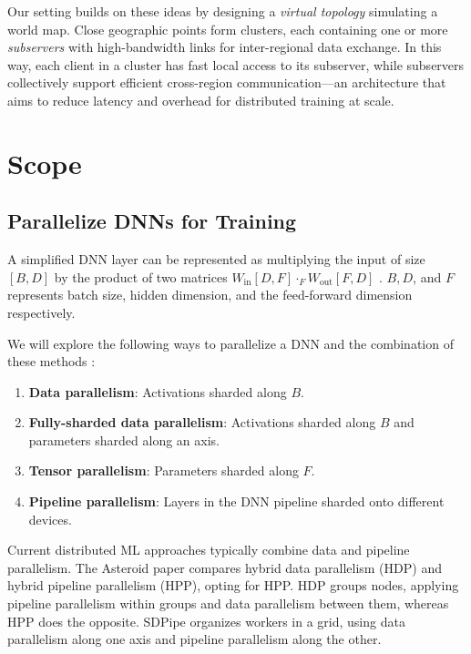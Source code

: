 \documentclass{article}
\begin{document}
Our setting builds on these ideas by designing a \emph{virtual topology} simulating a world map. Close geographic points form clusters, each containing one or more \emph{subservers} with high-bandwidth links for inter-regional data exchange. In this way, each client in a cluster has fast local access to its subserver, while subservers collectively support efficient cross-region communication—an architecture that aims to reduce latency and overhead for distributed training at scale.

\section{Scope}

\subsection{Parallelize DNNs for Training}

A simplified DNN layer can be represented as multiplying the input of size $[B, D]$ by the product of two matrices $W_{\text{in}}[D, F] \cdot_F W_{\text{out}} [F, D]$ \cite{scaling-book}. $B, D$, and $F$ represents batch size, hidden dimension, and the feed-forward dimension respectively.

We will explore the following ways to parallelize a DNN and the combination of these methods \cite{scaling-book}:

\begin{enumerate}
    \item \textbf{Data parallelism}: Activations sharded along $B$.
    \item \textbf{Fully-sharded data parallelism}: Activations sharded along $B$ and parameters sharded along an axis.
    \item \textbf{Tensor parallelism}: Parameters sharded along $F$.
    \item \textbf{Pipeline parallelism}: Layers in the DNN pipeline sharded onto different devices.
\end{enumerate}

Current distributed ML approaches typically combine data and pipeline parallelism. The Asteroid paper \cite{ye2024asteroid} compares hybrid data parallelism (HDP) and hybrid pipeline parallelism (HPP), opting for HPP. HDP groups nodes, applying pipeline parallelism within groups and data parallelism between them, whereas HPP does the opposite. SDPipe \cite{miao2023sdpipe} organizes workers in a grid, using data parallelism along one axis and pipeline parallelism along the other.
\end{document}
